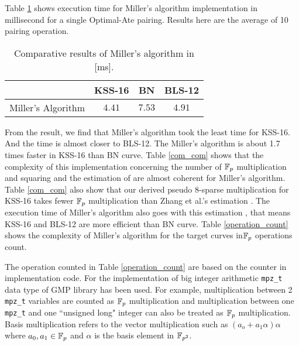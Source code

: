 \renewcommand{\baselinestretch}{1.0}
Table \ref{result_table} shows execution time for Miller's algorithm implementation in millisecond for a single Optimal-Ate pairing. Results here are the average of 10 pairing operation.
\renewcommand{\baselinestretch}{1.5}
\begin{table}[h!]
\centering
\caption{Comparative results of Miller's algorithm in [ms].}
\label{result_table}
\begin{tabular}{l|c|c|c|}
\cline{2-4}
                                         & KSS-16 & \quad BN   \quad  & BLS-12 \\ \hline
\multicolumn{1}{|l|}{Miller's Algorithm} & $4.41$ & $7.53$ & $4.91$ \\ \hline
\end{tabular}
\end{table}
\renewcommand{\baselinestretch}{1.0}
From the result, we find that Miller's algorithm took the least time for  KSS-16. 
And the time is almost closer to BLS-12.
The Miller's algorithm is about 1.7 times faster in KSS-16 than BN curve. 
Table \ref{com_com} shows that the complexity of this implementation concerning the number of ${\mathbb{F}}_{p}$ multiplication and squaring and the estimation of \cite{EPRINT:BarDuq17} are almost coherent for Miller's algorithm. 
Table \ref{com_com} also show that our derived pseudo 8-sparse multiplication for KSS-16 takes fewer ${\mathbb{F}}_{p}$ multiplication than Zhang et al.'s estimation \cite{INDOCRYPT:ZhaLin12}.
The execution time of Miller's algorithm also goes with this estimation \cite{EPRINT:BarDuq17}, that means KSS-16 and BLS-12 are more efficient than BN curve.
Table \ref{operation_count} shows the complexity of Miller's algorithm for the target curves in${\mathbb{F}}_{p}$ operations count.

The operation counted in Table \ref{operation_count} are based on the counter in implementation code. For the implementation of big integer arithmetic  \texttt{mpz\_t} data type of GMP \cite{gmp} library has been used. 
For example, multiplication between 2 \texttt{mpz\_t} variables are counted as ${\mathbb{F}}_{p}$  multiplication and  multiplication between one \texttt{mpz\_t} and one ``unsigned long" integer can also be treated as $\mathbb{F}_p$ multiplication.
Basis multiplication refers to the vector multiplication such as $(a_o+a_1\alpha)\alpha$ where $a_0,a_1\in {\mathbb{F}}_{p} $ and $\alpha$ is the basis element in $\mathbb{F}_{p^2}$. 

